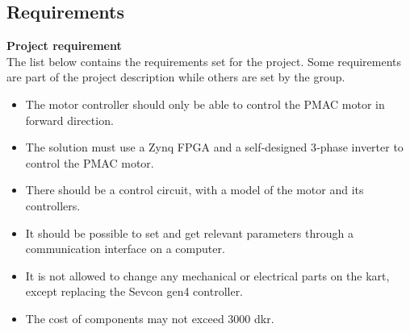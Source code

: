 
\newpage
\subsection{Requirements}
\label{sec:requirements}

\textbf{Project requirement} \\
The list below contains the requirements set for the project. Some requirements are part of the project description \cite{Project 1. semester - S19} while others are set by the group.

\begin{itemize}
\item The motor controller should only be able to control the PMAC motor in forward direction.

\item The solution must use a Zynq FPGA and a self‐designed 3‐phase inverter to control the PMAC motor.

\item There should be a control circuit, with a model of the motor and its controllers.

\item It should be possible to set and get relevant parameters through a communication interface on a computer. 

\item It is not allowed to change any mechanical or electrical parts on the kart, except replacing the Sevcon gen4 controller. 

\item The cost of components may not exceed 3000 dkr.

\end{itemize}